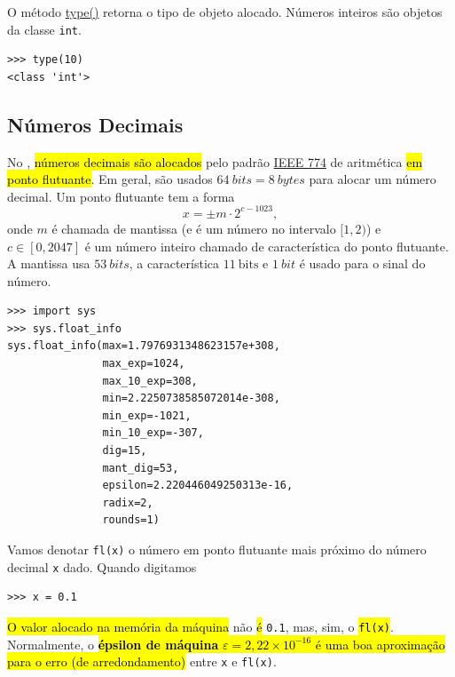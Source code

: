 \begin{obs}
  O método {\python} \href{https://docs.python.org/3/glossary.html#term-type}{type()} retorna o tipo de objeto alocado. Números inteiros são objetos da classe \lstinline+int+.
\begin{lstlisting}
>>> type(10)
<class 'int'>
\end{lstlisting}
\end{obs}

\subsection{Números Decimais}\label{cap_lingua_sec_numop:subsec:float}

No {\python}, \hl{números decimais são alocados} pelo padrão \href{https://en.wikipedia.org/wiki/IEEE\_754}{IEEE 774} de aritmética \hl{em ponto flutuante}. Em geral, são usados $64~\textit{bits} = 8~\textit{bytes}$ para alocar um número decimal. Um ponto flutuante tem a forma
\begin{equation}
  x = \pm m\cdot 2^{c-1023},
\end{equation}
onde $m$ é chamada de mantissa (e é um número no intervalo $[1,2)$) e $c\in [0, 2047]$ é um número inteiro chamado de característica do ponto flutuante. A mantissa usa $53~\textit{bits}$, a característica $11~\text{bits}$ e $1~\textit{bit}$ é usado para o sinal do número.

\begin{lstlisting}
>>> import sys
>>> sys.float_info
sys.float_info(max=1.7976931348623157e+308, 
               max_exp=1024, 
               max_10_exp=308, 
               min=2.2250738585072014e-308, 
               min_exp=-1021, 
               min_10_exp=-307, 
               dig=15, 
               mant_dig=53, 
               epsilon=2.220446049250313e-16, 
               radix=2, 
               rounds=1)
\end{lstlisting}

Vamos denotar \lstinline+fl(x)+ o número em ponto flutuante mais próximo do número decimal \lstinline+x+ dado. Quando digitamos
\begin{lstlisting}
>>> x = 0.1
\end{lstlisting}
\hl{O valor alocado na memória da máquina} não \hl{é} \lstinline+0.1+, mas, sim, o \hl{{\lstinline+fl(x)+}}. Normalmente, o \hl{\textbf{épsilon de máquina} $\varepsilon = 2,22\times 10^{-16}$ é uma boa aproximação para o erro (de arredondamento)} entre \lstinline+x+ e \lstinline+fl(x)+.

